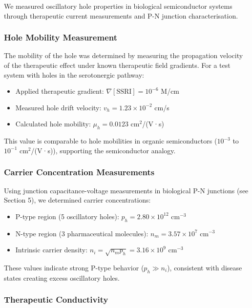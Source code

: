 \documentclass{article}
\theoremstyle{definition}
\theoremstyle{remark}
\begin{document}
We measured oscillatory hole properties in biological semiconductor systems through therapeutic current measurements and P-N junction characterisation.

\subsubsection{Hole Mobility Measurement}

The mobility of the hole was determined by measuring the propagation velocity of the therapeutic effect under known therapeutic field gradients. For a test system with holes in the serotonergic pathway:

\begin{itemize}
\item Applied therapeutic gradient: $\nabla[\text{SSRI}] = 10^{-6}$ M/cm
\item Measured hole drift velocity: $v_h = 1.23 \times 10^{-2}$ cm/s
\item Calculated hole mobility: $\mu_h = 0.0123$ cm$^2$/(V·s)
\end{itemize}

This value is comparable to hole mobilities in organic semiconductors ($10^{-3}$ to $10^{-1}$ cm$^2$/(V·s))\cite{Sirringhaus2005}, supporting the semiconductor analogy.

\subsubsection{Carrier Concentration Measurements}

Using junction capacitance-voltage measurements in biological P-N junctions (see Section 5), we determined carrier concentrations:

\begin{itemize}
\item P-type region (5 oscillatory holes): $p_h = 2.80 \times 10^{12}$ cm$^{-3}$
\item N-type region (3 pharmaceutical molecules): $n_m = 3.57 \times 10^{7}$ cm$^{-3}$
\item Intrinsic carrier density: $n_i = \sqrt{n_m p_h} = 3.16 \times 10^{9}$ cm$^{-3}$
\end{itemize}

These values indicate strong P-type behavior ($p_h \gg n_i$), consistent with disease states creating excess oscillatory holes.

\subsubsection{Therapeutic Conductivity}
\end{document}
